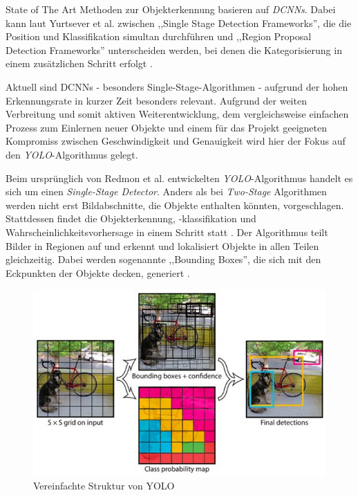 State of The Art Methoden zur Objekterkennung basieren auf \textit{\acp{DCNN}}. Dabei kann laut Yurtsever et al. zwischen ,,Single Stage Detection Frameworks'', die die Position und Klassifikation simultan durchführen und ,,Region Proposal Detection Frameworks'' unterscheiden werden, bei denen die Kategorisierung in einem zusätzlichen Schritt erfolgt \cite[Kapitel~V,~Absatz~A]{yurtsever_survey_2020}.

Aktuell sind \acp{DCNN} - besonders Single-Stage-Algorithmen - aufgrund der hohen Erkennungsrate in kurzer Zeit besonders relevant. Aufgrund der weiten Verbreitung und somit aktiven Weiterentwicklung, dem vergleichsweise einfachen Prozess zum Einlernen neuer Objekte und einem für das Projekt geeigneten Kompromiss zwischen Geschwindigkeit und Genauigkeit wird hier der Fokus auf den \textit{\ac{YOLO}}-Algorithmus gelegt.

Beim ursprünglich von Redmon et al. entwickelten \textit{\ac{YOLO}}-Algorithmus \cite{redmon_you_2016} handelt es sich um einen \textit{Single-Stage Detector}. Anders als bei \textit{Two-Stage} Algorithmen werden nicht erst Bildabschnitte, die Objekte enthalten könnten, vorgeschlagen. Stattdessen findet die Objekterkennung, -klassifikation und Wahrscheinlichkeitsvorhersage in einem Schritt statt \cite{bandyopadhyay_yolo_2021}. Der Algorithmus teilt Bilder in Regionen auf und erkennt und lokalisiert Objekte in allen Teilen gleichzeitig. Dabei werden sogenannte ,,Bounding Boxes'', die sich mit den Eckpunkten der Objekte decken, generiert \cite[Absatz~2.1.3]{zou_object_2019}.

\begin{figure}[ht]
    \centering
    \includegraphics[width=\textwidth]{Bilder/detection_yolo.jpg}
    \caption{Vereinfachte Struktur von YOLO \cite{redmon_you_2016}}
    \label{fig:detection_yolo}
\end{figure}

